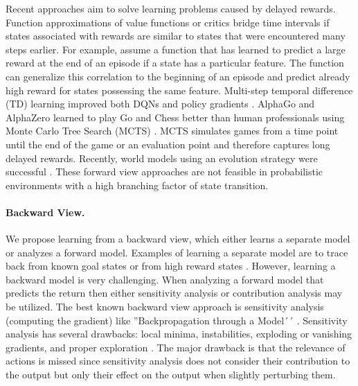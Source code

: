 \documentclass{article}
\begin{document}
\begin{appendices}
Recent approaches aim to solve learning problems caused
by delayed rewards.
Function approximations of value functions or critics \cite{Mnih:15,Mnih:16}
bridge time intervals if states associated
with rewards are similar to states that were encountered many steps earlier.
For example, assume a function that has learned to predict a large reward
at the end of an episode
if a state has a particular feature. 
The function can generalize this
correlation to the beginning of an episode and predict already
high reward for states possessing the same feature.
Multi-step temporal difference (TD) learning \cite{Sutton:88td,Sutton:18book} 
improved both DQNs
and policy gradients \cite{Hessel:17,Mnih:16}.
AlphaGo and AlphaZero learned to play Go and Chess better than
human professionals using Monte Carlo Tree Search (MCTS) \cite{Silver:16,Silver:17}.
MCTS simulates games from a time point until the end of 
the game or an evaluation point and therefore captures long delayed rewards.
Recently, world models using an evolution strategy were successful \cite{Ha:18}.
These forward view approaches are not
feasible in probabilistic environments with a high branching factor of state transition.

\paragraph{Backward View.}

We propose learning from a backward view, which 
either learns a separate model or analyzes a forward model. 
Examples of learning a separate model are 
to trace back from known goal states
\cite{Edwards:18} or from high reward states \cite{Goyal:18}.
However, learning a backward model is very challenging.
When analyzing a forward model that predicts the return then either
sensitivity analysis or contribution analysis may be utilized.
The best known backward view approach
is sensitivity analysis (computing the gradient)
like ''Backpropagation through a Model´´
\cite{Munro:87,Robinson:89,RobinsonFallside:89,Werbos:90,Bakker:07}. 
Sensitivity analysis has several drawbacks:
local minima, instabilities, exploding or vanishing
gradients, and proper exploration
\cite{Hochreiter:90,Schmidhuber:90diff}.
The major drawback is that
the relevance of actions is missed
since sensitivity analysis does not consider their contribution to 
the output but
only their effect on the output when slightly perturbing them.


\end{appendices}
\end{document}
